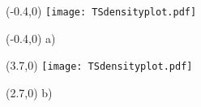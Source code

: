 \documentclass{natureJMK}
\begin{document}
\begin{textblock}{3}(-0.4,0) 
 \texttt{[image: TSdensityplot.pdf]}
\end{textblock}
\begin{textblock}{1}(-0.4,0) 
a)
\end{textblock}

\begin{textblock}{4}(3.7,0) 
 \texttt{[image: TSdensityplot.pdf]}
\end{textblock}
\begin{textblock}{1}(2.7,0) 
b)
\end{textblock}
\end{document}
